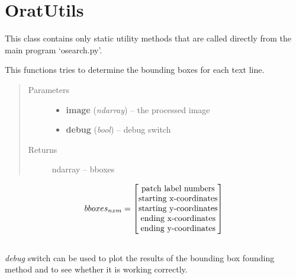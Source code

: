 \documentclass[letterpaper,10pt,english]{sphinxmanual}
\begin{document}
\section{OratUtils}
\label{code:oratutils}

\begin{fulllineitems}
\label{code:osearch.OratUtils}
This class contains only static utility methods that are called directly from the main program `osearch.py'.

\begin{fulllineitems}
\label{code:osearch.OratUtils.boundingBox}
This functions tries to determine the bounding boxes for each text line.
\begin{quote}\begin{description}
\item[{Parameters}] \leavevmode\begin{itemize}
\item {} 
\textbf{image} (\emph{ndarray}) -- the processed image

\item {} 
\textbf{debug} (\emph{bool}) -- debug switch

\end{itemize}

\item[{Returns}] \leavevmode
ndarray -- bboxes

\end{description}\end{quote}
\begin{gather}
\begin{split}bboxes_{nxm} = 
\begin{bmatrix}
        \text{patch label numbers}\\
        \text{starting x-coordinates}\\
        \text{starting y-coordinates}\\
        \text{ending x-coordinates}\\
        \text{ending y-coordinates}
\end{bmatrix}\end{split}\notag\\\begin{split}\end{split}\notag
\end{gather}
\emph{debug} switch can be used to plot the results of the bounding box 
founding method and to see whether it is working correctly.


\end{fulllineitems}
\end{fulllineitems}
\end{document}
